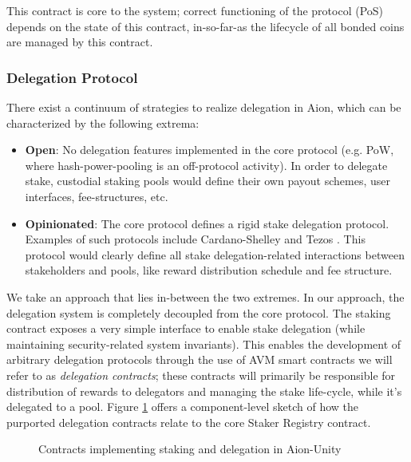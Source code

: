 This contract is core to the system; correct functioning of the protocol (PoS) depends on the state of this contract, in-so-far-as the lifecycle of all bonded coins are managed by this contract. 

\subsubsection{Delegation Protocol}
There exist a continuum of strategies to realize delegation in Aion, which can be characterized by the following extrema:
\begin{itemize}
    \item \textbf{Open}: No delegation features implemented in the core protocol (e.g. PoW, where hash-power-pooling is an off-protocol activity). In order to delegate stake, custodial staking pools would define their own payout schemes, user interfaces, fee-structures, etc. 
    \item \textbf{Opinionated}: The core protocol defines a rigid stake delegation protocol. Examples of such protocols include Cardano-Shelley \cite{KBC19} and Tezos \cite{Goo14}. This protocol would clearly define all stake delegation-related interactions between stakeholders and pools, like reward distribution schedule and fee structure.   
\end{itemize}

We take an approach that lies in-between the two extremes. In our approach, the delegation system is completely decoupled from the core protocol. The staking contract exposes a very simple interface to enable stake delegation (while maintaining security-related system invariants). This enables the development of arbitrary delegation protocols through the use of AVM smart contracts we will refer to as \textit{delegation contracts}; these contracts will primarily be responsible for distribution of rewards to delegators and managing the stake life-cycle, while it's delegated to a pool. Figure \ref{fig:delegation_scheme} offers a component-level sketch of how the purported delegation contracts relate to the core Staker Registry contract. 

\begin{figure}[ht]
\centering
{}
\caption{Contracts implementing staking and delegation in Aion-Unity}
\label{fig:delegation_scheme}
\end{figure}


